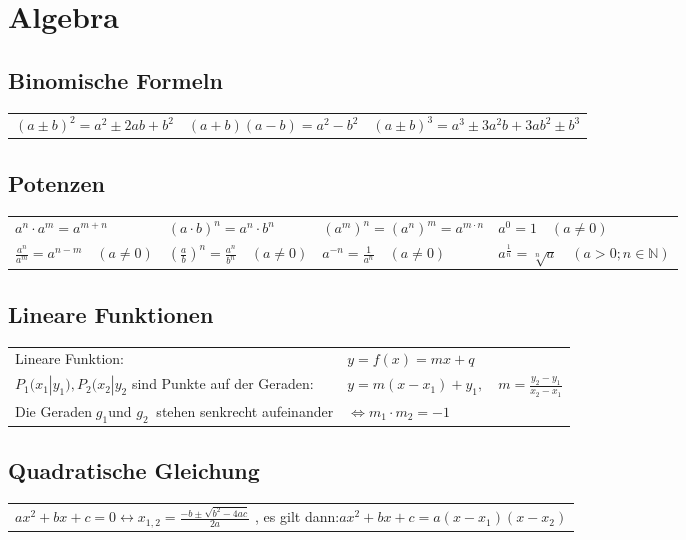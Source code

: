 
\section{Algebra}
\subsection{Binomische Formeln}
\begin{tabularx}{\columnwidth}{XXX}
	$(a\pm b)^2=a^2\pm 2ab+b^2$ & $(a+b)(a-b)=a^2-b^2$ & $(a \pm b)^3 = a^3 \pm 3a^2 b + 3ab^2 \pm b^3$
\end{tabularx}

\subsection{Potenzen}
\begin{tabularx}{\columnwidth}{XXXl}
	$a^n \cdot a^m = a^{m+n}$&$(a \cdot b)^n = a^n \cdot b^n $&$(a^m)^n = (a^n)^m = a^{m \cdot n}$&$a^0 = 1 \quad (a \neq 0)$
	\\
	$\frac{a^n}{a^m}=a^{n-m} \quad (a \neq 0)$&$(\frac{a}{b})^n=\frac{a^n}{b^n} \quad (a \neq 0)$&$ a^{-n}=\frac{1}{a^n} \quad (a \neq 0) $&$ a^{\frac{1}{n}}=\sqrt[n]{a} \quad ( a > 0; n \in	\mathbb{N}) $			
\end{tabularx}

\subsection{Lineare Funktionen}
\begin{tabularx}{\columnwidth}{Xl}
	Lineare Funktion: & $ y = f(x)=mx +q $
	\\
	$ P_{1}(x_{1}|y_{1}),P_{2}(x_{2}|y_{2}$ \qquad sind Punkte auf der Geraden: & $ y=m(x-x_{1})+y_{1}, \quad m= \frac{y_{2} - y_{1}}{x_{2} - x_{1}} $
	\\
	Die Geraden$ \;  g_{1} $und $g_{2} \:$ stehen senkrecht aufeinander & $\Leftrightarrow m_{1} \cdot m_{2} = -1 $
\end{tabularx}

\subsection{Quadratische Gleichung}
\begin{tabularx}{\columnwidth}{l}
	$ ax^2+bx+c=0 \leftrightarrow x_{1,2}=\frac{-b\pm\sqrt{b^2-4ac}}{2a} $ \qquad, es gilt dann:\quad $ ax^2+bx+c=a(x-x_{1})(x-x_{2}) $	
\end{tabularx}

